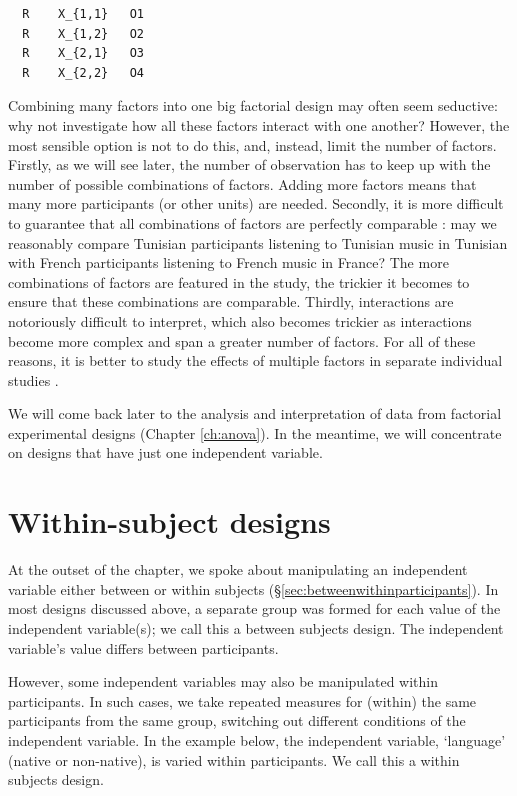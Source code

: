 \documentclass[
]{book}
\begin{document}
\begin{verbatim}
  R    X_{1,1}   O1
  R    X_{1,2}   O2
  R    X_{2,1}   O3
  R    X_{2,2}   O4
\end{verbatim}

Combining many factors into one big factorial design may often seem seductive: why not investigate how all these factors interact with one another? However, the most sensible option is not to do this, and, instead, limit the number of factors. Firstly, as we will see later, the number of observation has to keep up with the number of possible combinations of factors. Adding more factors means that many more participants (or other units) are needed. Secondly, it is more difficult to guarantee that all combinations of factors are perfectly comparable \citep[p.266]{SCC02}: may we reasonably compare Tunisian participants listening to Tunisian music in Tunisian with French participants listening to French music in France? The more combinations of factors are featured in the study, the trickier it becomes to ensure that these combinations are comparable. Thirdly, interactions are notoriously difficult to interpret, which also becomes trickier as interactions become more complex and span a greater number of factors. For all of these reasons, it is better to study the effects of multiple factors in separate individual studies \citep{Quene10}.

We will come back later to the analysis and interpretation of data from factorial experimental designs (Chapter \ref{ch:anova}).
In the meantime, we will concentrate on designs that have just one independent variable.

\hypertarget{sec:within-subject-designs}{%
\section{Within-subject designs}\label{sec:within-subject-designs}}

At the outset of the chapter, we spoke about manipulating an independent variable either between or within subjects (§\ref{sec:betweenwithinparticipants}). In most designs discussed above, a separate group was formed for each value of the independent variable(s); we call this a between subjects design. The independent variable's value differs between participants.

However, some independent variables may also be manipulated within participants. In such cases, we take repeated measures for (within) the same participants from the same group, switching out different conditions of the independent variable. In the example below, the independent variable, `language' (native or non-native), is varied within participants. We call this a within subjects design.
\end{document}
